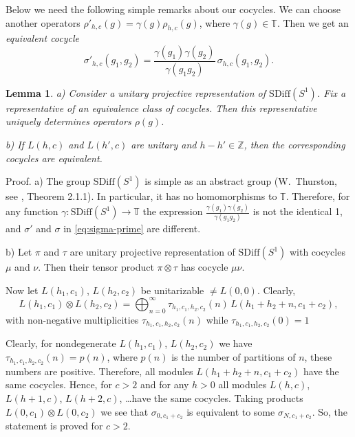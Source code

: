 \documentclass[]{amsart}
\newtheorem{lemma}[theorem]{Lemma}
\def\Z{{\mathbb Z}}
\def\T{\mathbb T}
\def\sm{\smallskip}
\def\SDiff{\mathrm{SDiff}}
\begin{document}
Below we need the following simple remarks about our cocycles.
We can  choose another operators $\rho'_{h,c}(g)= \gamma(g)\rho_{h,c}(g)$,
where $\gamma(g)\in \T$. Then we get an {\it equivalent cocycle}
\begin{equation}
\sigma'_{h,c}(g_1,g_2)= \frac{\gamma(g_1)\gamma(g_2)}{\gamma(g_1g_2)}
\,\sigma_{h,c}(g_1,g_2).  
\label{eq:sigma-prime}
\end{equation}

\begin{lemma}
{\rm a)}
Consider a unitary projective representation of $\SDiff(S^1)$.
 Fix a representative of an equivalence class
of cocycles. Then this representative  
    uniquely determines operators $\rho(g)$. 

\sm

{\rm b)} If $L(h,c)$ and $L(h',c)$ are unitary and $h-h'\in\Z$,
 then the corresponding cocycles are equivalent. 
\end{lemma}
 
{\sc Proof.}  a) The group $\SDiff(S^1)$
is simple as an abstract group (W.~Thurston, see \cite{Ban}, Theorem 2.1.1). In particular, it has no homomorphisms
to  $\T$.
Therefore, for any function $\gamma:\SDiff(S^1)\to \T$ the expression
 $\frac{\gamma(g_1)\gamma(g_2)}{\gamma(g_1g_2)}$ is not the identical
 1, and $\sigma'$ and $\sigma$ in \eqref{eq:sigma-prime}
 are different.
 
 \sm 

b) Let $\pi$ and $\tau$ are unitary projective representation of 
$\SDiff(S^1)$ with cocycles $\mu$ and $\nu$. Then their tensor product
 $\pi \otimes \tau$ has cocycle $\mu\nu$.

Now let $L(h_1,c_1)$, $L(h_2,c_2)$ be unitarizable
$\ne L(0,0)$.
Clearly, 
$$
L(h_1,c_1)\otimes L(h_2,c_2)= \bigoplus_{n=0}^\infty 
\tau_{h_1,c_1,h_2,c_2}(n) \,
L(h_1+h_2+n, c_1+c_2),
$$
with non-negative multiplicities $\tau_{h_1,c_1,h_2,c_2}(n)$ while
$\tau_{h_1,c_1,h_2,c_2}(0)=1$ 


 Clearly, for nondegenerate  $L(h_1,c_1)$, $L(h_2,c_2)$ we have
 $\tau_{h_1,c_1,h_2,c_2}(n)=p(n)$,
where  $p(n)$ is the number of partitions of $n$, these numbers are positive.
Therefore, all modules $L(h_1+h_2+n, c_1+c_2)$ have the same cocycles.
Hence, for $c>2$ and for any $h>0$ all modules $L(h,c)$, $L(h+1,c)$,
$L(h+2,c)$, \dots have the same cocycles. Taking products
$L(0,c_1)\otimes L(0,c_2)$ we see that $\sigma_{0,c_1+c_2}$
is equivalent to some $\sigma_{N,c_1+c_2}$. So, the statement
is proved for $c>2$.
 
\end{document}
